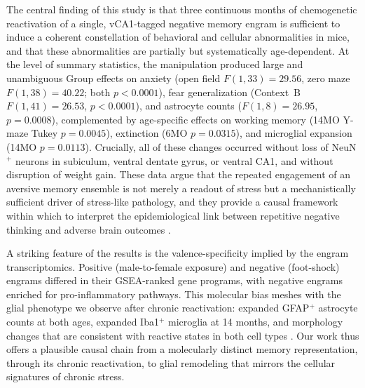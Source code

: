 \documentclass[11pt]{article}
\begin{document}
The central finding of this study is that three continuous months of chemogenetic reactivation of a single, vCA1-tagged negative memory engram is sufficient to induce a coherent constellation of behavioral and cellular abnormalities in mice, and that these abnormalities are partially but systematically age-dependent. At the level of summary statistics, the manipulation produced large and unambiguous Group effects on anxiety (open field $F(1,33)=29.56$, zero maze $F(1,38)=40.22$; both $p<0.0001$), fear generalization (Context~B $F(1,41)=26.53$, $p<0.0001$), and astrocyte counts ($F(1,8)=26.95$, $p=0.0008$), complemented by age-specific effects on working memory (14MO Y-maze Tukey $p=0.0045$), extinction (6MO $p=0.0315$), and microglial expansion (14MO $p=0.0113$). Crucially, all of these changes occurred without loss of NeuN$^{+}$ neurons in subiculum, ventral dentate gyrus, or ventral CA1, and without disruption of weight gain. These data argue that the repeated engagement of an aversive memory ensemble is not merely a readout of stress but a mechanistically sufficient driver of stress-like pathology, and they provide a causal framework within which to interpret the epidemiological link between repetitive negative thinking and adverse brain outcomes \citep{marchant2020rnt}.

A striking feature of the results is the valence-specificity implied by the engram transcriptomics. Positive (male-to-female exposure) and negative (foot-shock) engrams differed in their GSEA-ranked gene programs, with negative engrams enriched for pro-inflammatory pathways. This molecular bias meshes with the glial phenotype we observe after chronic reactivation: expanded GFAP$^{+}$ astrocyte counts at both ages, expanded Iba1$^{+}$ microglia at 14 months, and morphology changes that are consistent with reactive states in both cell types \citep{york2018threedmorph}. Our work thus offers a plausible causal chain from a molecularly distinct memory representation, through its chronic reactivation, to glial remodeling that mirrors the cellular signatures of chronic stress.
\end{document}

